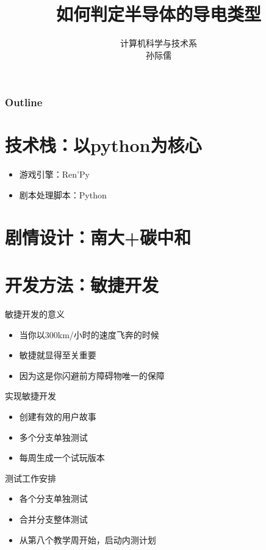\documentclass{beamer}
\begin{document}
\title{如何判定半导体的导电类型}
\author{计算机科学与技术系 \\ 孙际儒}
\frame{\titlepage}

\begin{frame}
  \frametitle{Outline}
  \tableofcontents
\end{frame}

\section{技术栈：以python为核心}
\begin{frame}
  \begin{itemize}
    \item 游戏引擎：Ren'Py
    \item 剧本处理脚本：Python
  \end{itemize}
\end{frame}

\section{剧情设计：南大+碳中和}
\begin{frame}
  
\end{frame}

\section{开发方法：敏捷开发}
\begin{frame}{敏捷开发的意义}
  \begin{itemize}
    \item 当你以300km/小时的速度飞奔的时候
    \item 敏捷就显得至关重要
    \item 因为这是你闪避前方障碍物唯一的保障
  \end{itemize}
\end{frame}

\begin{frame}{实现敏捷开发}
  \begin{itemize}
    \item 创建有效的用户故事
    \item 多个分支单独测试
    \item 每周生成一个试玩版本
  \end{itemize}
\end{frame}

\begin{frame}{测试工作安排}
  \begin{itemize}
    \item 各个分支单独测试
    \item 合并分支整体测试
    \item 从第八个教学周开始，启动内测计划
  \end{itemize}
\end{frame}
\end{document}
